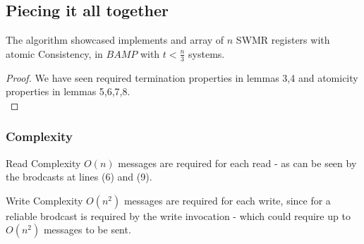\subsection{Piecing it all together}
\begin{frame}
    \begin{theorem}
        The algorithm showcased implements and array of $n$ SWMR
        registers with atomic Consistency, in $BAMP$ with $t<\frac{n}{3}$ systems.
    \end{theorem}
    \begin{proof}
        We have seen required termination properties in lemmas 3,4 and atomicity
        properties in lemmas 5,6,7,8.\\
    \end{proof}
\end{frame}

\begin{frame}
    \frametitle{Complexity}
    
    \begin{block}{Read Complexity}
        \alert{$O(n)$} messages are required for each read - as can be seen
        by the brodcasts at lines (6) and (9).
    \end{block}
    \begin{block}{Write Complexity}
        \alert{$O(n^2)$} messages are required for each write,
        since for a \alert{reliable} brodcast is required
        by the write invocation - which could require up to $O(n^2)$
        messages to be sent. 
    \end{block}
\end{frame}